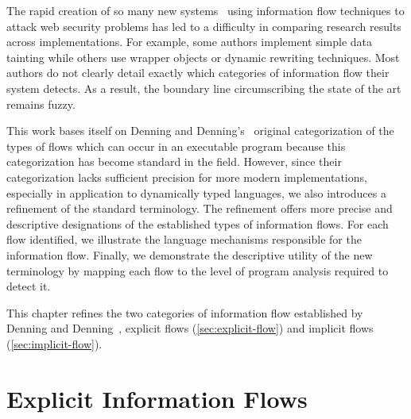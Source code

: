 The rapid creation of so many new systems~\cite{chugh.etal+09, yaowen.etal+04, jang.etal+10, robertson.vigna+09, vogt.etal+07} using information flow techniques to attack web security problems has led to a difficulty in comparing research results across implementations.
For example, some authors implement simple data tainting while others use wrapper objects or dynamic rewriting techniques.
Most authors do not clearly detail exactly which categories of information flow their system detects.
As a result, the boundary line circumscribing the state of the art remains fuzzy.


This work bases itself on Denning and Denning's~\cite{denning.denning+77} original categorization of the types of flows which can occur in an executable program because this categorization has become standard in the field.
However, since their categorization lacks sufficient precision for more modern implementations, especially in application to dynamically typed languages, we also introduces a refinement of the standard terminology.
The refinement offers more precise and descriptive designations of the established types of information flows.
For each flow identified, we illustrate the language mechanisms responsible for the information flow.
Finally, we demonstrate the descriptive utility of the new terminology by mapping each flow to the level of program analysis required to detect it.

This chapter refines the two categories of information flow established by Denning and Denning~\cite{denning.denning+77}, explicit flows (\autoref{sec:explicit-flow}) and implicit flows (\autoref{sec:implicit-flow}).

\section{Explicit Information Flows}
\label{sec:explicit-flow}

